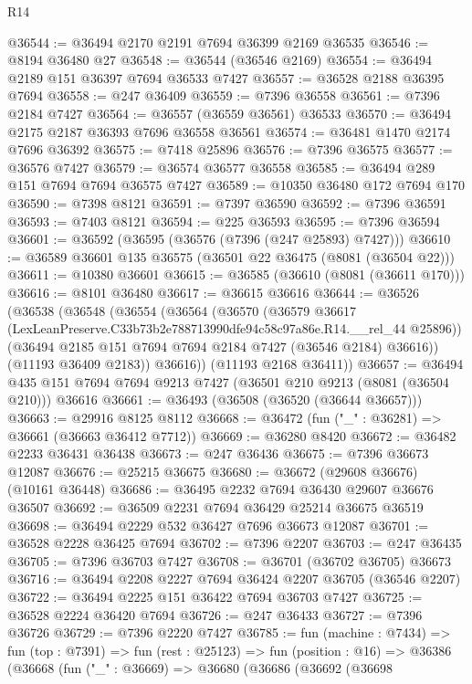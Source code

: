 \begin{lexlean}{R14}
\begin{coremodule}
@36544 := @36494 @2170 @2191 @7694 @36399 @2169 @36535
@36546 := @8194 @36480 @27
@36548 := @36544 (@36546 @2169)
@36554 := @36494 @2189 @151 @36397 @7694 @36533 @7427
@36557 := @36528 @2188 @36395 @7694
@36558 := @247 @36409
@36559 := @7396 @36558
@36561 := @7396 @2184 @7427
@36564 := @36557 (@36559 @36561) @36533
@36570 := @36494 @2175 @2187 @36393 @7696 @36558 @36561
@36574 := @36481 @1470 @2174 @7696 @36392
@36575 := @7418 @25896
@36576 := @7396 @36575
@36577 := @36576 @7427
@36579 := @36574 @36577 @36558
@36585 := @36494 @289 @151 @7694 @7694 @36575 @7427
@36589 := @10350 @36480 @172 @7694 @170
@36590 := @7398 @8121
@36591 := @7397 @36590
@36592 := @7396 @36591
@36593 := @7403 @8121
@36594 := @225 @36593
@36595 := @7396 @36594
@36601 := @36592 (@36595 (@36576 (@7396 (@247 @25893) @7427)))
@36610 := @36589 @36601 @135 @36575 (@36501 @22 @36475 (@8081 (@36504 @22)))
@36611 := @10380 @36601
@36615 := @36585 (@36610 (@8081 (@36611 @170)))
@36616 := @8101 @36480
@36617 := @36615 @36616
@36644 := @36526
    (@36538
      (@36548
        (@36554
          (@36564
            (@36570
              (@36579
                @36617
                (LexLeanPreserve.C33b73b2e788713990dfe94c58c97a86e.R14.__rel_44 @25896))
              (@36494 @2185 @151 @7694 @7694 @2184 @7427 (@36546 @2184) @36616))
            (@11193 @36409 @2183))
          @36616))
      (@11193 @2168 @36411))
@36657 := @36494 @435 @151 @7694 @7694 @9213 @7427 (@36501 @210 @9213 (@8081 (@36504 @210))) @36616
@36661 := @36493 (@36508 (@36520 (@36644 @36657)))
@36663 := @29916 @8125 @8112
@36668 := @36472 (fun ("_" : @36281) => @36661 (@36663 @36412 @7712))
@36669 := @36280 @8420
@36672 := @36482 @2233 @36431 @36438
@36673 := @247 @36436
@36675 := @7396 @36673 @12087
@36676 := @25215 @36675
@36680 := @36672 (@29608 @36676) (@10161 @36448)
@36686 := @36495 @2232 @7694 @36430 @29607 @36676 @36507
@36692 := @36509 @2231 @7694 @36429 @25214 @36675 @36519
@36698 := @36494 @2229 @532 @36427 @7696 @36673 @12087
@36701 := @36528 @2228 @36425 @7694
@36702 := @7396 @2207
@36703 := @247 @36435
@36705 := @7396 @36703 @7427
@36708 := @36701 (@36702 @36705) @36673
@36716 := @36494 @2208 @2227 @7694 @36424 @2207 @36705 (@36546 @2207)
@36722 := @36494 @2225 @151 @36422 @7694 @36703 @7427
@36725 := @36528 @2224 @36420 @7694
@36726 := @247 @36433
@36727 := @7396 @36726
@36729 := @7396 @2220 @7427
@36785 := fun (machine : @7434) =>
  fun (top : @7391) =>
  fun (rest : @25123) =>
  fun (position : @16) =>
  @36386
    (@36668
      (fun ("_" : @36669) =>
      @36680
        (@36686
          (@36692
            (@36698

\end{coremodule}
\end{lexlean}
